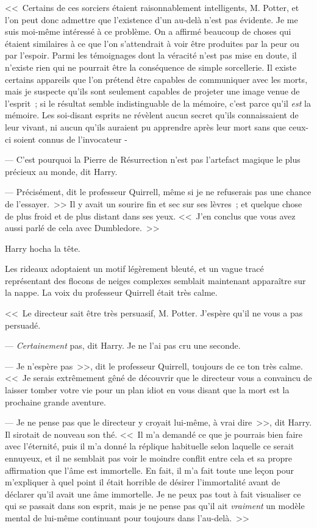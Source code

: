 <<~Certains de ces sorciers étaient raisonnablement intelligents, M. Potter, et l'on peut donc admettre que l'existence d'un au-delà n'est pas évidente. Je me suis moi-même intéressé à ce problème. On a affirmé beaucoup de choses qui étaient similaires à ce que l'on s'attendrait à voir être produites par la peur ou par l'espoir. Parmi les témoignages dont la véracité n'est pas mise en doute, il n'existe rien qui ne pourrait être la conséquence de simple sorcellerie. Il existe certains appareils que l'on prétend être capables de communiquer avec les morts, mais je suspecte qu'ils sont seulement capables de projeter une image venue de l'esprit~; si le résultat semble indistinguable de la mémoire, c'est parce qu'il \emph{est} la mémoire. Les soi-disant esprits ne révèlent aucun secret qu'ils connaissaient de leur vivant, ni aucun qu'ils auraient pu apprendre après leur mort sans que ceux-ci soient connus de l'invocateur -

--- C'est pourquoi la Pierre de Résurrection n'est pas l'artefact magique le plus précieux au monde, dit Harry.

--- Précisément, dit le professeur Quirrell, même si je ne refuserais pas une chance de l'essayer.~>> Il y avait un sourire fin et sec sur ses lèvres~; et quelque chose de plus froid et de plus distant dans ses yeux. <<~J'en conclus que vous avez aussi parlé de cela avec Dumbledore.~>>

Harry hocha la tête.

Les rideaux adoptaient un motif légèrement bleuté, et un vague tracé représentant des flocons de neiges complexes semblait maintenant apparaître sur la nappe. La voix du professeur Quirrell était très calme.

<<~Le directeur sait être très persuasif, M. Potter. J'espère qu'il ne vous a pas persuadé.

--- \emph{Certainement} pas, dit Harry. Je ne l'ai pas cru une seconde.

--- Je n'espère pas~>>, dit le professeur Quirrell, toujours de ce ton très calme. <<~Je serais extrêmement gêné de découvrir que le directeur vous a convaincu de laisser tomber votre vie pour un plan idiot en vous disant que la mort est la prochaine grande aventure.

--- Je ne pense pas que le directeur y croyait lui-même, à vrai dire~>>, dit Harry. Il sirotait de nouveau son thé. <<~Il m'a demandé ce que je pourrais bien faire avec l'éternité, puis il m'a donné la réplique habituelle selon laquelle ce serait ennuyeux, et il ne semblait pas voir le moindre conflit entre cela et sa propre affirmation que l'âme est immortelle. En fait, il m'a fait toute une leçon pour m'expliquer à quel point il était horrible de désirer l'immortalité avant de déclarer qu'il avait une âme immortelle. Je ne peux pas tout à fait visualiser ce qui se passait dans son esprit, mais je ne pense pas qu'il ait \emph{vraiment} un modèle mental de lui-même continuant pour toujours dans l'au-delà.~>>

